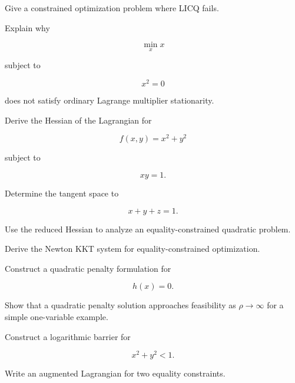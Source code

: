 \begin{exercise}[3]
Give a constrained optimization problem where LICQ fails.
\end{exercise}

\begin{exercise}[3]
Explain why

\[
\min_x x
\]

subject to

\[
x^2=0
\]

does not satisfy ordinary Lagrange multiplier stationarity.
\end{exercise}

\begin{exercise}[3]
Derive the Hessian of the Lagrangian for

\[
f(x,y)=x^2+y^2
\]

subject to

\[
xy=1.
\]
\end{exercise}

\begin{exercise}[3]
Determine the tangent space to

\[
x+y+z=1.
\]
\end{exercise}

\begin{exercise}[3]
Use the reduced Hessian to analyze an equality-constrained quadratic
problem.
\end{exercise}

\begin{exercise}[3]
Derive the Newton KKT system for equality-constrained optimization.
\end{exercise}

\begin{exercise}[3]
Construct a quadratic penalty formulation for

\[
h(x)=0.
\]
\end{exercise}

\begin{exercise}[3]
Show that a quadratic penalty solution approaches feasibility as
\(\rho\to\infty\) for a simple one-variable example.
\end{exercise}

\begin{exercise}[3]
Construct a logarithmic barrier for

\[
x^2+y^2<1.
\]
\end{exercise}

\begin{exercise}[3]
Write an augmented Lagrangian for two equality constraints.
\end{exercise}

